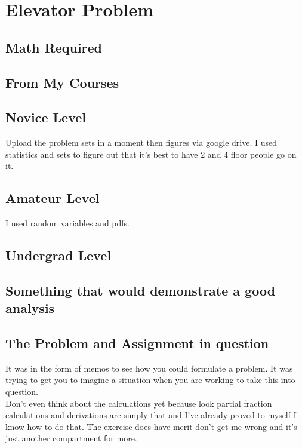 \section{Elevator Problem}

\subsection{Math Required}







\subsection{From My Courses}

\subsection{Novice Level}

Upload the problem sets in a moment then figures via google drive. 
I used statistics and sets to figure out that it's best to have 2 and 4 floor people go on it. 


\subsection{Amateur Level}
I used random variables and pdfs. 


\subsection{Undergrad Level}

\subsection{Something that would demonstrate a good analysis}








\subsection{The Problem and Assignment in question}
It was in the form of memos to see how you could formulate a problem. It was trying to get you to imagine a situation when you are working to take this into question. \\ 

Don't even think about the calculations yet because look partial fraction calculations and derivations are simply that and I've already proved to myself I know how to do that. The exercise does have merit don't get me wrong and it's just another compartment for more. \\


